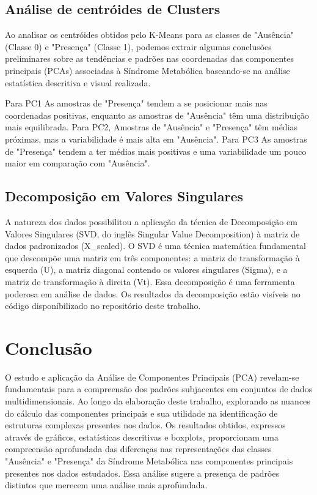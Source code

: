 \documentclass[12pt, a4paper]{article}
\begin{document}
\subsection{Análise de centróides de Clusters}
Ao analisar os centróides obtidos pelo K-Means para as classes de "Ausência" (Classe 0) e "Presença" (Classe 1), podemos extrair algumas conclusões preliminares sobre as tendências e padrões nas coordenadas das componentes principais (PCAs) associadas à Síndrome Metabólica baseando-se na análise estatística descritiva e visual realizada.

Para PC1 As amostras de "Presença" tendem a se posicionar mais nas coordenadas positivas, enquanto as amostras de "Ausência" têm uma distribuição mais equilibrada. Para PC2, Amostras de "Ausência" e "Presença" têm médias próximas, mas a variabilidade é mais alta em "Ausência". Para PC3 As amostras de "Presença" tendem a ter médias mais positivas e uma variabilidade um pouco maior em comparação com "Ausência".

\subsection{Decomposição em Valores Singulares}
A natureza dos dados possibilitou a aplicação da técnica de Decomposição em Valores Singulares (SVD, do inglês Singular Value Decomposition) à matriz de dados padronizados (X\_scaled). O SVD é uma técnica matemática fundamental que descompõe uma matriz em três componentes: a matriz de transformação à esquerda (U), a matriz diagonal contendo os valores singulares (Sigma), e a matriz de transformação à direita (Vt). Essa decomposição é uma ferramenta poderosa em análise de dados. Os resultados da decomposição estão visíveis no código disponíbilizado no repositório deste trabalho.

\section{Conclusão}

O estudo e aplicação da Análise de Componentes Principais (PCA) revelam-se fundamentais para a compreensão dos padrões subjacentes em conjuntos de dados multidimensionais. Ao longo da elaboração deste trabalho, explorando as nuances do cálculo das componentes principais e sua utilidade na identificação de estruturas complexas presentes nos dados. Os resultados obtidos, expressos através de gráficos, estatísticas descritivas e boxplots, proporcionam uma compreensão aprofundada das diferenças nas representações das classes "Ausência" e "Presença" da Síndrome Metabólica nas componentes principais presentes nos dados estudados. Essa análise sugere a presença de padrões distintos que merecem uma análise mais aprofundada. \\
\end{document}
